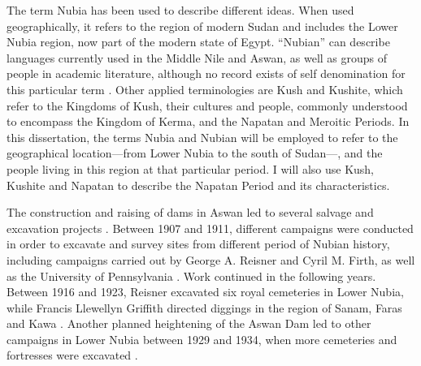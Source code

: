 The term Nubia has been used to describe different ideas. When used geographically, it refers to the region of modern Sudan and includes the Lower Nubia region, now part of the modern state of Egypt. “Nubian” can describe languages currently used in the Middle Nile and Aswan, as well as groups of people in academic literature, although no record exists of self denomination for this particular term \parencites{williamsNubiaBriefIntroduction2020}. Other applied terminologies are Kush and Kushite, which refer to the Kingdoms of Kush, their cultures and people, commonly understood to encompass the Kingdom of Kerma, and the Napatan and Meroitic Periods. In this dissertation, the terms Nubia and Nubian will be employed to refer to the geographical location—from Lower Nubia to the south of Sudan—, and the people living in this region at that particular period. I will also use Kush, Kushite and Napatan to describe the Napatan Period and its characteristics.


The construction and raising of dams in Aswan led to several salvage and excavation projects \parencites{ahmedHistoryArchaeologicalWork2020}. Between 1907 and 1911, different campaigns were conducted in order to excavate and survey sites from different period of Nubian history, including campaigns carried out by George A. Reisner and Cyril M. Firth, as well as the University of Pennsylvania \parencites{reisnerArchaeologicalSurveyNubia1909, reisnerArchaeologicalSurveyNubia1910, randall-maciverAreika1909, woolleyKaranògRomanoNubian1910, woolleyKaranògTown1911, firthArchaeologicalReportNubia1912, firthArchaeologicalSurveyNubia1915, firthArchaeologicalSurveyNubia1927, junkerBerichtÜberGrabungen1920, junkerErmenneBerichtÜber1925, junkerToschkeBerichtÜber1926}. Work continued in the following years. Between 1916 and 1923, Reisner excavated six royal cemeteries in Lower Nubia, while Francis Llewellyn Griffith directed diggings in the region of Sanam, Faras and Kawa \parencites{griffithOxfordExcavationsNubia1922, griffithOxfordExcavationsNubia1923, griffithOxfordExcavationsNubia1926, macadamTemplesKawa1949}. Another planned heightening of the Aswan Dam led to other campaigns in Lower Nubia between 1929 and 1934, when more cemeteries and fortresses were excavated \parencites{emeryExcavationsSurveyWadi1935, emeryRoyalTombsBallana1938, steindorffAnibaMissionArchéologique1935}.


